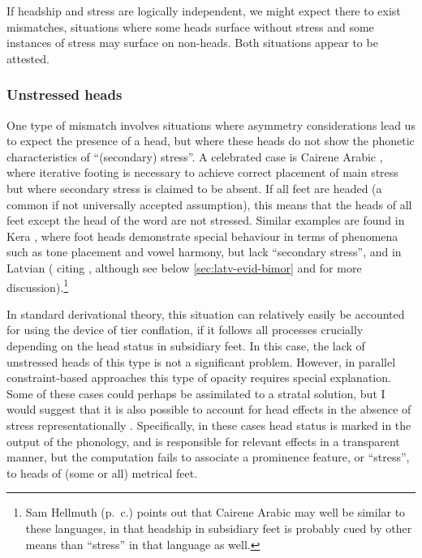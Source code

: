 If headship and stress are logically independent, we might expect there to exist mismatches, \ie situations where some heads surface without stress and some instances of stress may surface on non-heads. Both situations appear to be attested.

\subsubsection{Unstressed heads}
\label{sec:unstressed-heads}

One type of mismatch involves situations where asymmetry considerations lead us to expect the presence of a head, but where these heads do not show the phonetic characteristics of \enquote{(secondary) stress}. A celebrated case is Cairene Arabic \citep[\egm][]{hayes1995}, where iterative footing is necessary to achieve correct placement of main stress but where secondary stress is claimed to be absent. If all feet are headed (a common if not universally accepted assumption), this means that the heads of all feet except the head of the word are not stressed. Similar examples are found in Kera \citep{pearce06:_kera}, where foot heads demonstrate special behaviour in terms of phenomena such as tone placement and vowel harmony, but lack \enquote{secondary stress}, and in Latvian (\citealt{buckley09:_local} citing \citealt{karins96:_latvian}, although see below \cref{sec:latv-evid-bimor} and \citealt{daugavet05:_palig} for more discussion).\footnote{Sam Hellmuth (p.~c.) points out that Cairene Arabic may well be similar to these languages, in that headship in subsidiary feet is probably cued by other means than \enquote{stress} in that language as well.}

In standard derivational theory, this situation can relatively easily be accounted for using the device of tier conflation, if it follows all processes crucially depending on the head status in subsidiary feet. In this case, the lack of unstressed heads of this type is not a significant problem. However, in parallel constraint\hyp based approaches this type of opacity requires special explanation. Some of these cases could perhaps be assimilated to a stratal solution, but I would suggest that it is also possible to account for head effects in the absence of stress representationally \parencite[\cf][]{crowhurst96}. Specifically, in these cases head status is marked in the output of the phonology, and is responsible for relevant effects in a transparent manner, but the computation fails to associate a prominence feature, or \enquote{stress}, to heads of (some or all) metrical feet.

